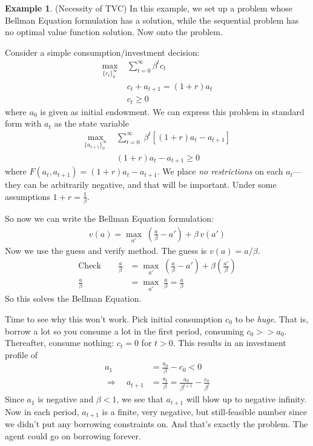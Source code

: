 \documentclass[12pt]{article}
\numberwithin{equation}{section} %
\theoremstyle{plain}
\theoremstyle{definition}
\newtheorem{ex}[thm]{Example}
\theoremstyle{remark}
\newcommand{\sumtinfz}{\sum^\infty_{t=0}}
\begin{document}
\clearpage
\begin{ex}{(Necessity of TVC)}
In this example, we set up a problem whose Bellman Equation formulation
has a solution, while the sequential problem has no optimal value
function solution. Now onto the problem.

Consider a simple consumption/investment decision:
\begin{align*}
  \max_{\{c_t\}_0^\infty} \; &\sumtinfz \beta^t c_t \\
  & c_t + a_{t+1} = (1+r)a_t\\
  & c_t \geq 0
\end{align*}
where $a_0$ is given as initial endowment. We can express this problem
in standard form with $a_t$ as the state variable
\begin{align*}
  \max_{\{a_{t+1}\}_0^\infty} \;
  &\sumtinfz \; \beta^t [(1+r)a_t - a_{t+1}] \\
  & (1+r)a_t - a_{t+1} \geq 0
\end{align*}
where $F(a_t,a_{t+1}) = (1+r)a_t - a_{t+1}$.
We place \emph{no restrictions} on each $a_t$---they can be arbitrarily
negative, and that will be important.
Under some assumptions $1+r = \frac{1}{\beta}$.

So now we can write the Bellman Equation formulation:
\begin{align*}
  v(a) = \max_{a'} \; \left(\frac{a}{\beta} - a'\right) + \beta \, v(a')
\end{align*}
Now we use the guess and verify method. The guess is $v(a) = a/\beta$.
\begin{align*}
  \text{Check} \qquad
  \frac{a}{\beta}
  &= \max_{a'} \;
  \left(\frac{a}{\beta} - a'\right)
  + \beta \left(\frac{a'}{\beta}\right)\\
  \frac{a}{\beta}
  &= \max_{a'} \;
  \frac{a}{\beta}
  =
  \frac{a}{\beta}
\end{align*}
So this solves the Bellman Equation.

Time to see why this won't work. Pick initial consumption $c_0$ to be
\emph{huge}. That is, borrow a lot so you consume a lot in the first
period, consuming $c_0 >> a_0$.
Thereafter, consume nothing: $c_t=0$ for $t>0$. This results in an
investment profile of
\begin{align*}
  a_{1} &= \frac{a_0}{\beta} - c_0 < 0 \\
  \Rightarrow \quad
  a_{t+1} &= \frac{a_t}{\beta}
  = \frac{a_0}{\beta^{t+1}} - \frac{c_0}{\beta^t}
\end{align*}
Since $a_1$ is negative and $\beta<1$, we see that $a_{t+1}$ will blow
up to negative infinity.
Now in each period, $a_{t+1}$ is a finite, very negative, but
still-feasible number since we didn't put any borrowing constraints on.
And that's exactly the problem. The agent could go on borrowing forever.


\end{ex}
\end{document}
